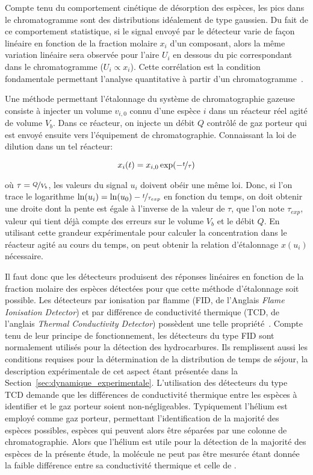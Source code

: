 \pagebreak

Compte tenu du comportement cinétique de désorption des espèces, les pics dans le chromatogramme sont des distributions \textendash{} idéalement de type gaussien. Du fait de ce comportement statistique, si le signal envoyé par le détecteur varie de façon linéaire en fonction de la fraction molaire $x_{i}$ d'un composant, alors la même variation linéaire sera observée pour l'aire $U_{i}$ en dessous du pic correspondant dans le chromatogramme ($U_{i}\propto x_{i}$). Cette corrélation est la condition fondamentale permettant l'analyse quantitative à partir d'un chromatogramme~\cite{Rouessac2007}.

Une méthode permettant l'étalonnage du système de chromatographie gazeuse consiste à injecter un volume $v_{i,0}$ connu d'une espèce $i$ dans un réacteur réel agité de volume $V_{b}$. Dans ce réacteur, on injecte un débit $Q$ contrôlé de gaz porteur qui est envoyé ensuite vers l'équipement de chromatographie. Connaissant la loi de dilution dans un tel réacteur: 

\[
x_{i}(t)=x_{i,0}\exp(-\nicefrac{t}{\tau})
\]

\noindent où $\tau=\nicefrac{Q}{V_{b}}$, les valeurs du signal $u_{i}$ doivent obéir une même loi. Donc, si l'on trace le logarithme $\ln(u_{i})=\ln(u_{0})-\nicefrac{t}{\tau_{exp}}$ en fonction du temps, on doit obtenir une droite dont la pente est égale à l'inverse de la valeur de $\tau$, que l'on note $\tau_{exp}$, valeur qui tient déjà compte des erreurs sur le volume $V_{b}$ et le débit $Q$. En utilisant cette grandeur expérimentale pour calculer la concentration dans le réacteur agité au cours du temps, on peut obtenir la relation d'étalonnage $x(u_{i})$ nécessaire.

Il faut donc que les détecteurs produisent des réponses linéaires en fonction de la fraction molaire des espèces détectées pour que cette méthode d'étalonnage soit possible. Les détecteurs par ionisation par flamme (FID, de l'Anglais \textit{Flame Ionisation Detector}) et par différence de conductivité thermique (TCD, de l'anglais \textit{Thermal Conductivity Detector}) possèdent une telle propriété~\cite{Rouessac2007}. Compte tenu de leur principe de fonctionnement, les détecteurs du type FID sont normalement utilisés pour la détection des hydrocarbures. Ils remplissent aussi les conditions requises pour la détermination de la distribution de temps de séjour, la description expérimentale de cet aspect étant présentée dans la Section~\ref{sec:dynamique_experimentale}. L'utilisation des détecteurs du type TCD demande que les différences de conductivité thermique entre les espèces à identifier et le gaz porteur soient non-négligeables. Typiquement l'hélium est employé comme gaz porteur, permettant l'identification de la majorité des espèces possibles, espèces qui peuvent alors être séparées par une colonne de chromatographie. Alors que l'hélium est utile pour la détection de la majorité des espèces de la présente étude, la molécule  ne peut pas être mesurée étant donnée la faible différence entre sa conductivité thermique et celle de .

